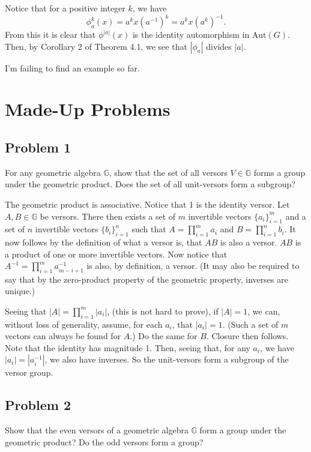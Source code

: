 \documentclass[12pt]{article}
\newcommand{\G}{\mathbb{G}}
\newcommand{\aut}{\mbox{Aut}}
\begin{document}
Notice that for a positive integer $k$, we have
\begin{equation*}
\phi_a^k(x) = a^kx(a^{-1})^k=a^kx(a^k)^{-1}.
\end{equation*}
From this it is clear that $\phi^{|a|}(x)$ is the identity automorphism in $\aut(G)$.
Then, by Corollary 2 of Theorem 4.1, we see that $|\phi_a|$ divides $|a|$.

I'm failing to find an example so far.

\section*{Made-Up Problems}

\subsection*{Problem 1}

For any geometric algebra $\G$, show that
the set of all versors $V\in\G$ forms a group under the geometric product.
Does the set of all unit-versors form a subgroup?

The geometric product is associative.
Notice that 1 is the identity versor.  Let $A,B\in\G$ be versors.
There then exists a set of $m$ invertible vectors $\{a_i\}_{i=1}^m$ and
a set of $n$ invertible vectors $\{b_i\}_{i=1}^n$ such that
$A=\prod_{i=1}^m a_i$ and $B=\prod_{i=1}^n b_i$.
It now follows by the definition of what a versor is, that $AB$ is also a versor.
$AB$ is a product of one or more invertible vectors.
Now notice that $A^{-1}=\prod_{i=1}^m a_{m-i+1}^{-1}$ is also, by
definition, a versor.  (It may also be required to say that by the zero-product
property of the geometric property, inverses are unique.)

Seeing that $|A|=\prod_{i=1}^m |a_i|$, (this is not hard to prove), if $|A|=1$, we can, without loss
of generality, assume, for each $a_i$, that $|a_i|=1$.  (Such a set of $m$
vectors can always be found for $A$.)  Do the same for $B$.  Closure then follows.  Note that the identity
has magnitude 1.  Then, seeing that, for any $a_i$, we have $|a_i|=|a_i^{-1}|$,
we also have inverses.  So the unit-versors form a subgroup of the versor group.

\subsection*{Problem 2}

Show that the even versors of a geometric algebra $\G$
form a group under the geometric product?  Do the odd versors form a group?
\end{document}
